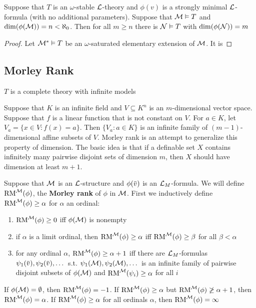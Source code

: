 \documentclass[11pt]{article}
\def \RM {\text{RM}}
\begin{document}
\begin{lemma}[]
Suppose that \(T\) is an \(\omega\)-stable \(\mathcal{L}\)-theory and \(\phi(v)\) is a strongly minimal \(\mathcal{L}\)-formula
(with no additional parameters). Suppose that \(\mathcal{M}\vDash T\) and \(\dim(\phi(\mathcal{M}))=n<\aleph_0\). Then for
all \(m\ge n\) there is \(\mathcal{N}\vDash T\) with \(\dim(\phi(\mathcal{N}))=m\)
\end{lemma}

\begin{proof}
Let \(\mathcal{M}^*\vDash T\)  be an \(\omega\)-saturated elementary extension of \(\mathcal{M}\). It is
\end{proof}

\subsection{Morley Rank}
\label{sec:orgfd342a9}
\(T\) is a complete theory with infinite models

Suppose that \(K\) is an infinite field and \(V\subseteq K^n\) is an \(m\)-dimensional vector space.
Suppose that \(f\) is a linear function that is not constant on \(V\). For \(a\in K\),
let \(V_a=\{x\in V:f(x)=a\}\). Then \(\{V_a:a\in K\}\) is an infinite family of \((m-1)\)-dimensional
affine subsets of \(V\). Morley rank is an attempt to generalize this property of dimension. The
basic idea is that if a definable set \(X\) contains infinitely many pairwise disjoint sets of
dimension \(m\), then \(X\) should have dimension at least \(m+1\).

\begin{definition}[]
Suppose that \(\mathcal{M}\) is an \(\mathcal{L}\)-structure and \(\phi(\barv)\) is an \(\mathcal{L}_M\)-formula. We will
define \(\RM^{\calm}(\phi)\), the \textbf{Morley rank} of \(\phi\) in \(\mathcal{M}\). First we inductively
define \(\RM^{\calm}(\phi)\ge\alpha\) for \(\alpha\) an ordinal:
\begin{enumerate}
\item \(\RM^{\calm}(\phi)\ge 0\) iff \(\phi(\mathcal{M})\) is nonempty
\item if \(\alpha\) is a limit ordinal, then \(\RM^{\calm}(\phi)\ge\alpha\) iff \(\RM^{\calm}(\phi)\ge\beta\) for all \(\beta<\alpha\)
\item for any ordinal \(\alpha\), \(\RM^{\calm}(\phi)\ge\alpha+1\) iff there
are \(\mathcal{L}_M\)-formulas \(\psi_1(\barv),\psi_2(\barv),\dots\) s.t. \(\psi_1(\mathcal{M}),\psi_2(\mathcal{M}),\dots\) is an infinite family
of pairwise disjoint subsets of \(\phi(\mathcal{M})\) and \(\RM^{\calm}(\psi_i)\ge\alpha\) for all \(i\)
\end{enumerate}


If \(\phi(\mathcal{M})=\emptyset\), then \(\RM^{\calm}(\phi)=-1\). If \(\RM^{\calm}(\phi)\ge\alpha\) but \(\RM^{\calm}(\phi)\not\ge\alpha+1\),
then \(\RM^{\calm}(\phi)=\alpha\). If \(\RM^{\calm}(\phi)\ge\alpha\) for all ordinals \(\alpha\), then \(\RM^{\calm}(\phi)=\infty\)
\end{definition}
\end{document}
